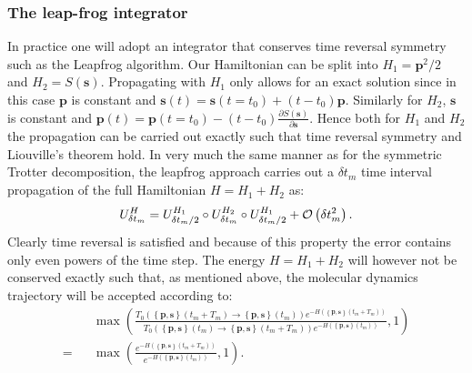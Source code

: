 \subsubsection{The leap-frog integrator}
  In practice one will adopt an  integrator  that conserves  time reversal symmetry such as the Leapfrog  algorithm.   Our Hamiltonian can be split into 
 $H_1   = \pmb{p}^2/2 $ and $H_2   =  S(\pmb{s} ) $.     Propagating with $H_1$ only allows for an exact solution since in this case $\pmb{p}$ is constant and $  \pmb{s}(t)   = \pmb{s}(t=t_0) + (  t - t_0)\pmb{p}   $.  Similarly for $H_2 $, $\pmb{s}$  is constant and 
 $ \pmb{p}(t)   = \pmb{p}(t=t_0)  -(   t - t_0) \frac{\partial S(\pmb{s} )}{\partial \pmb{s} }   $.  Hence  both for $H_1 $ and $H_2$   the propagation  can be carried out exactly   such that time reversal symmetry and  Liouville's theorem hold.  In very much the same manner as for the symmetric Trotter decomposition, the leapfrog approach carries  out a  $\delta t_m$ time interval propagation  of the full Hamiltonian $H = H_1 + H_2 $ as: 
 \begin{equation}	
 	 U^H_{\delta t_m}    = U^{H_1}_{\delta t_m/2}  \circ  U^{H_2}_{\delta t_m } \circ  U^{H_1}_{\delta t_m/2}   +{\cal O } \left(  \delta t_m^2 \right). 
 \end{equation}
Clearly  time reversal is satisfied and because of this property the error  contains only even powers of the  time step. The energy $H =  H_1 + H_2 $ will however not be conserved exactly  such that, as mentioned above, the molecular dynamics trajectory  will be accepted according to:
\begin{eqnarray}
	& & \max \left(   
	 \frac{T_0 \left(  \left\{ \pmb{p},  \pmb{s} \right\}  (t_m  + T_m)    \rightarrow   \left\{  \pmb{p},  \pmb{s} \right\} (t_m)  \right) e^{-H( \left\{ \pmb{p},  \pmb{s} \right\}  (t_m  + T_m) ) } }{
 T_0 \left(  \left\{ \pmb{p},  \pmb{s} \right\}  (t_m  )    \rightarrow   \left\{  \pmb{p},  \pmb{s} \right\} (t_m + T_m)  \right) e^{-H( \left\{ \pmb{p},  \pmb{s} \right\}  (t_m  ) ) }} , 1 \right) \nonumber \\
 = & &  \max \left(   
	 \frac{ e^{-H( \left\{ \pmb{p},  \pmb{s} \right\}  (t_m  + T_m) ) } }{
                   e^{-H( \left\{ \pmb{p},  \pmb{s} \right\}  (t_m  ) ) }} , 1 \right).
\end{eqnarray}
